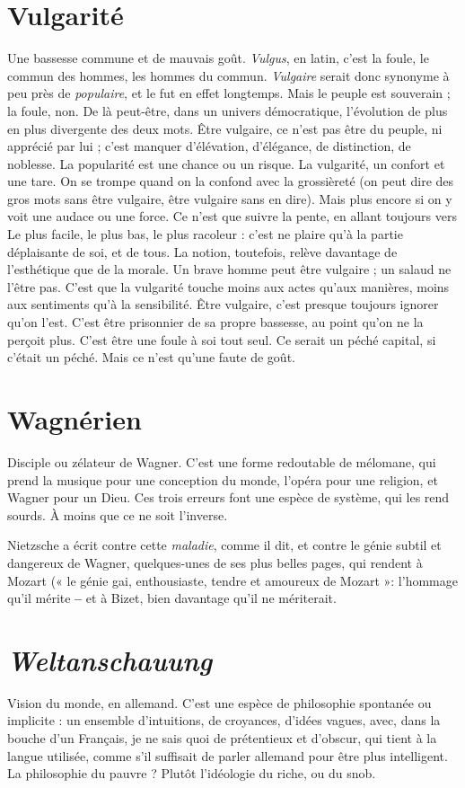 \section{Vulgarité}
Une bassesse commune et de mauvais goût.
{\it Vulgus}, en latin, c’est la foule, le commun des hommes, les
hommes du commun. {\it Vulgaire} serait donc synonyme à peu près de {\it populaire},
et le fut en effet longtemps. Mais le peuple est souverain ; la foule, non. De là
peut-être, dans un univers démocratique, l’évolution de plus en plus divergente
des deux mots. Être vulgaire, ce n’est pas être du peuple, ni apprécié par lui ;
c’est manquer d’élévation, d'élégance, de distinction, de noblesse. La popularité
est une chance ou un risque. La vulgarité, un confort et une tare. On se trompe
quand on la confond avec la grossièreté (on peut dire des gros mots sans être
vulgaire, être vulgaire sans en dire). Mais plus encore si on y voit une audace ou
une force. Ce n’est que suivre la pente, en allant toujours vers Le plus facile, le
plus bas, le plus racoleur : c’est ne plaire qu’à la partie déplaisante de soi, et de
tous. La notion, toutefois, relève davantage de l’esthétique que de la morale.
Un brave homme peut être vulgaire ; un salaud ne l’être pas. C’est que la vulgarité
touche moins aux actes qu’aux manières, moins aux sentiments qu'à la
sensibilité. Être vulgaire, c’est presque toujours ignorer qu’on l’est. C’est être
prisonnier de sa propre bassesse, au point qu’on ne la perçoit plus. C’est être
une foule à soi tout seul. Ce serait un péché capital, si c'était un péché. Mais ce
n’est qu’une faute de goût.

\section{Wagnérien}
Disciple ou zélateur de Wagner. C’est une forme redoutable
de mélomane, qui prend la musique pour une conception du
monde, l’opéra pour une religion, et Wagner pour un Dieu. Ces trois erreurs
font une espèce de système, qui les rend sourds. À moins que ce ne soit
l'inverse.

Nietzsche a écrit contre cette {\it maladie}, comme il dit, et contre le génie
subtil et dangereux de Wagner, quelques-unes de ses plus belles pages, qui rendent
à Mozart (« le génie gai, enthousiaste, tendre et amoureux de Mozart »:
l'hommage qu’il mérite {\bf --} et à Bizet, bien davantage qu’il ne mériterait.

\section{{\it Weltanschauung}}
Vision du monde, en allemand. C’est une espèce de
philosophie spontanée ou implicite : un ensemble
d’intuitions, de croyances, d’idées vagues, avec, dans la bouche d’un Français,
je ne sais quoi de prétentieux et d’obscur, qui tient à la langue utilisée, comme
s’il suffisait de parler allemand pour être plus intelligent. La philosophie du
pauvre ? Plutôt l’idéologie du riche, ou du snob.

